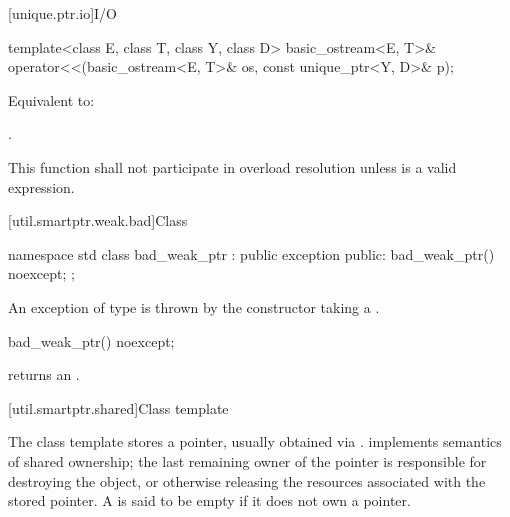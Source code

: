 [unique.ptr.io]{I/O}

%
\begin{itemdecl}
template<class E, class T, class Y, class D>
  basic_ostream<E, T>& operator<<(basic_ostream<E, T>& os, const unique_ptr<Y, D>& p);
\end{itemdecl}

\begin{itemdescr}
\pnum
\effects Equivalent to: 

\pnum
\returns {}.

\pnum
\remarks This function shall not participate in overload resolution
unless  is a valid expression.
\end{itemdescr}

%
[util.smartptr.weak.bad]{Class }
%
\begin{codeblock}
namespace std {
  class bad_weak_ptr : public exception {
  public:
    bad_weak_ptr() noexcept;
  };
}
\end{codeblock}

\pnum
An exception of type  is thrown by the 
constructor taking a .

%
%
\begin{itemdecl}
bad_weak_ptr() noexcept;
\end{itemdecl}

\begin{itemdescr}
\pnum\ensures  {} returns an
 \ntbs{}.

\end{itemdescr}

[util.smartptr.shared]{Class template }

\pnum
{}%
The  class template stores a pointer, usually obtained
via .  implements semantics of shared ownership;
the last remaining owner of the pointer is responsible for destroying
the object, or otherwise releasing the resources associated with the stored pointer. A
 is said to be empty if it does not own a pointer.

